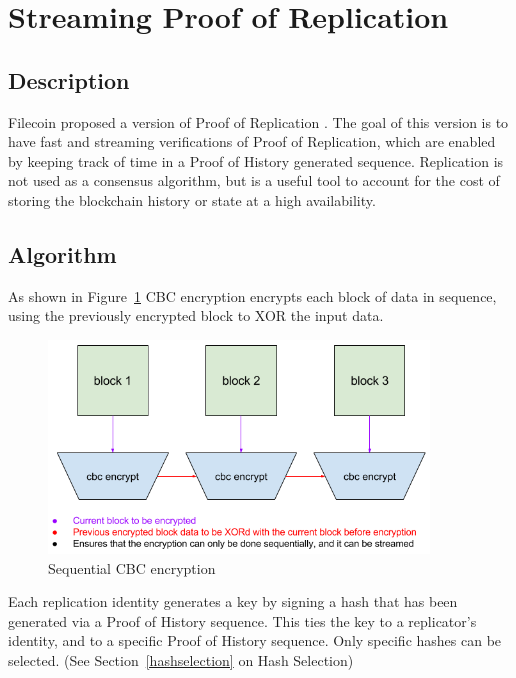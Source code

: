 \documentclass[12pt]{article}
\begin{document}
\section{Streaming Proof of Replication}\label{porep}
\subsection{Description}
Filecoin proposed a version of Proof of Replication \cite{filecoinporep}. The goal of this version is to have fast and streaming verifications of Proof of Replication, which are enabled by keeping track of time in a Proof of History generated sequence. Replication is not used as a consensus algorithm, but is a useful tool to account for the cost of storing the blockchain history or state at a high availability.
\subsection{Algorithm}
As shown in Figure~\ref{fig:encrypt} CBC encryption encrypts each block of data in sequence, using the previously encrypted block to XOR the input data.

\begin{figure}[h]
  \begin{center}
    \centering
    \includegraphics[width=0.9\textwidth]{figures/cbc_encryption_001.png}
    \caption[Fig 7]{Sequential CBC encryption\label{fig:encrypt}}
  \end{center}
  \end{figure}

Each replication identity generates a key by signing a hash that has been generated via a Proof of History sequence. This ties the key to a replicator’s identity, and to a specific Proof of History sequence. Only specific hashes can be selected. (See Section~\ref{hashselection} on Hash Selection)
\end{document}
